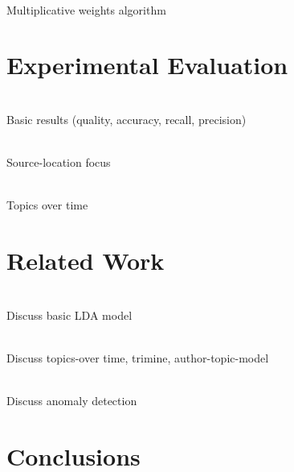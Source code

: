 \documentclass{sig-alternate}
\begin{document}
\ \\Multiplicative weights algorithm

\section{Experimental Evaluation}
\label{sec:exp}

\ \\Basic results (quality, accuracy, recall, precision)

\ \\Source-location focus

\ \\Topics over time

\section{Related Work}
\label{sec:related_work}

\ \\Discuss basic LDA model

\ \\Discuss topics-over time, trimine, author-topic-model

\ \\Discuss anomaly detection


\section{Conclusions}
\label{sec:conclusion}




\appendix
\end{document}
